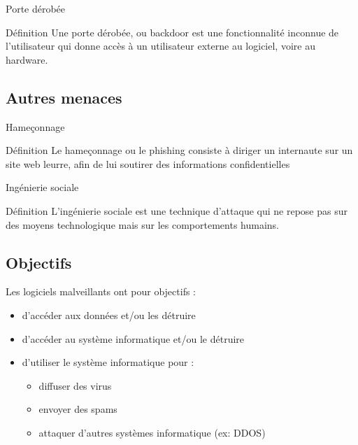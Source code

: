 \documentclass[12pt]{beamer}
\begin{document}
		\begin{frame}{Porte dérobée}
			\begin{exampleblock}{Définition}
					Une \alert{porte dérobée}, ou \alert{backdoor} est une fonctionnalité inconnue de l'utilisateur qui donne accès à un utilisateur externe au logiciel, voire au hardware.
			\end{exampleblock}		
		\end{frame}
	
	\subsection{Autres menaces}
	
		\begin{frame}{Hameçonnage}
			\begin{exampleblock}{Définition}
				Le \alert{hameçonnage} ou le \alert{phishing} consiste à diriger un internaute sur un site web leurre, afin de lui soutirer des informations confidentielles
			\end{exampleblock}
		\end{frame}
		
		\begin{frame}{Ingénierie sociale}
			\begin{exampleblock}{Définition}
				L'\alert{ingénierie sociale} est une technique d'attaque qui ne repose pas sur des moyens technologique mais sur les comportements humains.
			\end{exampleblock}
		\end{frame}	
		
	\subsection{Objectifs}	
	
		\begin{frame}
			Les \alert{logiciels malveillants} ont pour objectifs :
				\begin{itemize}
					\item d'accéder aux données et/ou les détruire
					\item d'accéder au système informatique et/ou le détruire
					\item d'utiliser le système informatique pour :
						\begin{itemize}
							\item diffuser des virus
							\item envoyer des spams
							\item attaquer d'autres systèmes informatique (ex: DDOS)
						\end{itemize}
				\end{itemize}
		\end{frame}
		
\end{document}
